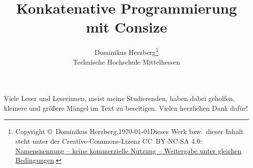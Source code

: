 \documentclass[a4paper]{refrep}
\theoremstyle{plain}
\begin{document}
\title{\bf Konkatenative Programmierung mit Consize}
\author{Dominikus Herzberg\thanks{%
Copyright \copyright\ Dominikus Herzberg,\today\medskip\newline Dieses Werk bzw.\ dieser Inhalt steht unter der Creative-Commons-Lizenz CC~BY-NC-SA 4.0: \href{https://creativecommons.org/licenses/by-nc-sa/4.0/}{Namensnennung -- keine kommerzielle Nutzung -- Weitergabe unter gleichen Bedingungen}.}%
\\Technische Hochschule Mittelhessen}
\date{}
\maketitle

Viele Leser und Leserinnen, meist meine Studierenden, haben dabei geholfen, kleinere und größere Mängel im Text zu beseitigen. Vielen herzlichen Dank dafür!

\newpage

\tableofcontents











\appendix





%
%
\end{document}
